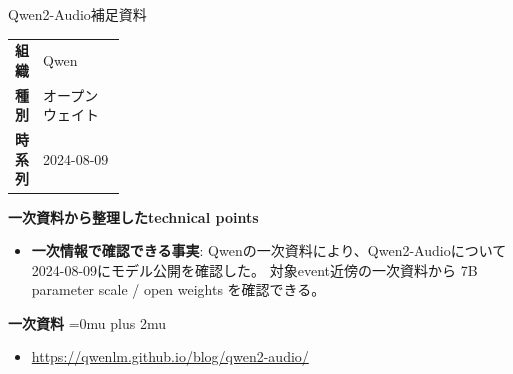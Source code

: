 \begin{technicalnote}{Qwen2-Audio}{補足資料}
\begingroup
\begin{tabularx}{\linewidth}{@{}>{\bfseries}p{0.22\linewidth}X@{}}
組織 & Qwen \\
種別 & オープンウェイト \\
時系列 & 2024-08-09 \\
\end{tabularx}
\smallskip
{\bfseries 一次資料から整理したtechnical points}
\begin{itemize}[leftmargin=1.5em,itemsep=0.35em]
\item \textbf{一次情報で確認できる事実}: Qwenの一次資料により、Qwen2-Audioについて2024-08-09にモデル公開を確認した。 対象event近傍の一次資料から 7B parameter scale / open weights を確認できる。
\end{itemize}
\begin{minipage}{\linewidth}
\begin{samepage}
{\bfseries 一次資料}
\begingroup\sloppy
\Urlmuskip=0mu plus 2mu\relax
\begin{itemize}[leftmargin=1.5em,itemsep=0.25em]
\item {\scriptsize\url{https://qwenlm.github.io/blog/qwen2-audio/}}
\end{itemize}
\endgroup
\end{samepage}
\end{minipage}
\endgroup
\end{technicalnote}
\medskip

